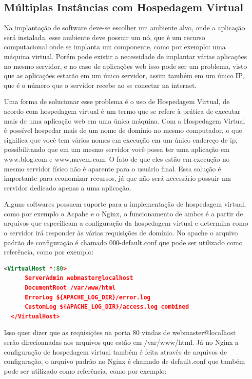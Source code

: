 \subsection{Múltiplas Instâncias com Hospedagem Virtual}

Na implantação de software deve-se escolher um ambiente alvo, onde a aplicação
será instalada, esse ambiente deve possuir um nó, que é um recurso computacional
onde se implanta um componente, como por exemplo: uma máquina virtual. Porém pode
existir a necessidade de implantar várias aplicações no mesmo servidor, e no caso
de aplicações web isso pode ser um problema, visto que as aplicações estarão em um
único servidor, assim também em um único IP, que é o número que o servidor recebe
ao se conectar na internet.

Uma forma de solucionar esse problema é o uso de Hospedagem Virtual, de acordo com
\cite{apachevh} hospedagem virtual é um termo que se refere à prática de executar
mais de uma aplicação web em uma única máquina. Com a Hospedagem Virtual é possível
hospedar mais de um nome de domínio no mesmo computador, o que significa que você
tem vários nomes em execução em um único endereço de ip, possibilitando que em um
mesmo servidor você possa ter uma aplicação em www.blog.com e www.nuvem.com. O fato
de que eles estão em execução no mesmo servidor físico não é aparente para o usuário final. Essa
solução é importante para economizar recursos, já que não será necessário possuir
um servidor dedicado apenas a uma aplicação.

Alguns softwares possuem suporte para a implementação de hospedagem virtual, como por
exemplo o Acpahe e o Nginx, o funcionamento de ambos é a partir de arquivos que
especificam a configuração da hospedagem virtual e determina como o servidor
irá responder às várias requisições de domínio. No apache o arquivo padrão de configuração
é chamado 000-default.conf que pode ser utilizado como referência, como por exemplo:

\begin{lstlisting}[language=Xml,label=dice_index,caption={Exemplo de arquivo de configuração de hospedagem virtual no apache}]
  <VirtualHost *:80>
      ServerAdmin webmaster@localhost
      DocumentRoot /var/www/html
      ErrorLog ${APACHE_LOG_DIR}/error.log
      CustomLog ${APACHE_LOG_DIR}/access.log combined
  </VirtualHost>
\end{lstlisting}

Isso quer dizer que as requisições na porta 80 vindas de webmaster@localhost serão
direcioanadas aos arquivos que estão em /var/www/html. Já no Nginx a configuração
de hospedagem virtual também é feita através de arquivos de configuração, o arquivo
padrão no Nginx é chamado de default.conf que também pode ser utilizado como
referência, como por exemplo:

